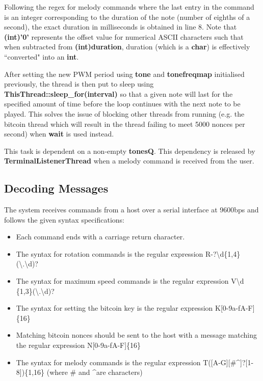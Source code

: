 \documentclass{article}
\begin{document}
\noindent
Following the regex for melody commands where the last entry in the command is an integer corresponding to the duration of the note (number of eighths of a second), the exact duration in milliseconds is obtained in line 8. Note that \textbf{(int)'0'} represents the offset value for numerical ASCII characters such that when subtracted from \textbf{(int)duration}, duration (which is a \textbf{char}) is effectively ``converted" into an \textbf{int}.

\bigskip

\noindent
After setting the new PWM period using \textbf{tone} and \textbf{tonefreqmap} initialised previously, the thread is then put to sleep using \textbf{ThisThread::sleep\_for(interval)} so that a given note will last for the specified amount of time before the loop continues with the next note to be played. This solves the issue of blocking other threads from running (e.g. the bitcoin thread which will result in the thread failing to meet 5000 nonces per second) when \textbf{wait} is used instead.

\bigskip

\noindent
This task is dependent on a non-empty \textbf{tonesQ}. This dependency is released by \textbf{TerminalListenerThread} when a melody command is received from the user.

\subsection{Decoding Messages}

\noindent The system receives commands from a host over a serial interface at 9600bps and follows the given syntax specifications:

 \begin{itemize}
	\item Each command ends with a carriage return character.
	\item The syntax for rotation commands is the regular expression R-?\textbackslash{}d\{1,4\}(\textbackslash{}.\textbackslash{}d)?
	\item The syntax for maximum speed commands is the regular expression V\textbackslash d \{1,3\}(\textbackslash{}.\textbackslash{}d)?
	\item The syntax for setting the bitcoin key is the regular expression K[0-9a-fA-F]\{16\}
	\item Matching bitcoin nonces should be sent to the host with a message matching the regular expression N[0-9a-fA-F]\{16\}
	\item The syntax for melody commands is the regular expression T([A-G][\#\textasciicircum{}]?[1-8])\{1,16\} (where \# and \textasciicircum{}are characters)

\end{itemize}
\end{document}
